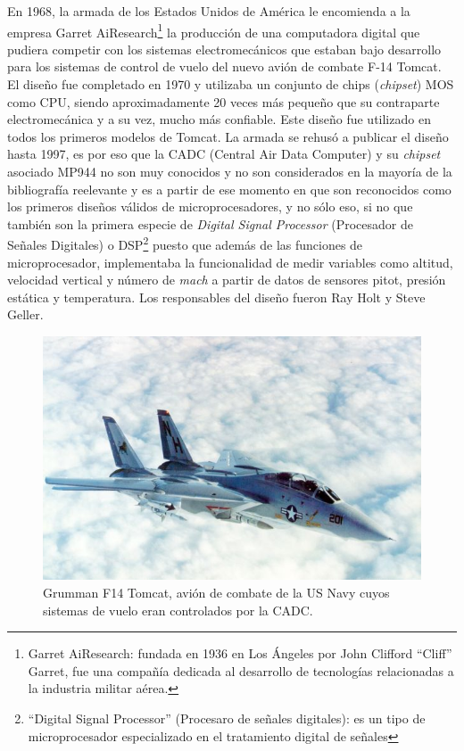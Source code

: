 En 1968, la armada de los Estados Unidos de América le encomienda a la empresa Garret AiResearch\footnote{Garret AiResearch: fundada en 1936 en Los Ángeles por John Clifford ``Cliff'' Garret, fue una compañía dedicada  al desarrollo de tecnologías relacionadas a la industria militar aérea.} la producción de una computadora digital que pudiera competir con los sistemas electromecánicos que estaban bajo desarrollo para los sistemas de control de vuelo del nuevo avión de combate F-14 Tomcat. El diseño fue completado en 1970 y utilizaba un conjunto de chips (\emph{chipset}) MOS como CPU, siendo aproximadamente 20 veces más pequeño que su contraparte electromecánica y a su vez, mucho más confiable. Este diseño fue utilizado en todos los primeros modelos de Tomcat. La armada se rehusó a publicar el diseño hasta 1997, es por eso que la CADC (Central Air Data Computer) y su \emph{chipset} asociado MP944 no son muy conocidos y no son considerados en la mayoría de la bibliografía reelevante y es a partir de ese momento en que son reconocidos como los primeros diseños válidos de microprocesadores, y no sólo eso, si no que también son la primera especie de \emph{Digital Signal Processor} (Procesador de Señales Digitales) o DSP\footnote{``Digital Signal Processor'' (Procesaro de señales digitales): es un tipo de microprocesador especializado en el tratamiento digital de señales} puesto que además de las funciones de microprocesador, implementaba la funcionalidad de medir variables como altitud, velocidad vertical y número de \emph{mach} a partir de datos de sensores pitot, presión estática y temperatura. Los responsables del diseño fueron Ray Holt y Steve Geller.

\begin{figure}
  \centering
  \includegraphics[scale=0.5]{./figures/C02-f14_tomcat}
  \captionsetup{justification=centering}
  \caption{Grumman F14 Tomcat, avión de combate de la US Navy cuyos sistemas de vuelo eran controlados por la CADC.}
  \label{fig:C02-f14_tomcat}
\end{figure}


